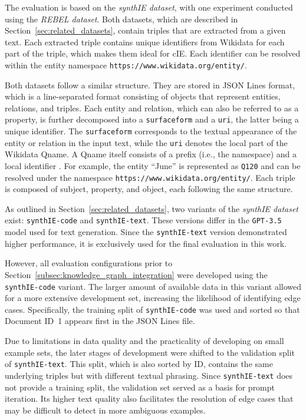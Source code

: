 \documentclass[a4paper,oneside,bibliography=totoc]{scrbook}
\begin{document}
The evaluation is based on the \textit{synthIE dataset}, with one experiment conducted using the \textit{REBEL dataset}. Both datasets, which are described in Section~\ref{sec:related_datasets}, contain triples that are extracted from a given text. Each extracted triple contains unique identifiers from Wikidata for each part of the triple, which makes them ideal for \ac{cIE}. Each identifier can be resolved within the entity namespace \texttt{https://www.wikidata.org/entity/}.

Both datasets follow a similar structure. They are stored in JSON Lines format, which is a line-separated format consisting of objects that represent entities, relations, and triples. Each entity and relation, which can also be referred to as a property, is further decomposed into a \texttt{surfaceform} and a \texttt{uri}, the latter being a unique identifier. The \texttt{surfaceform} corresponds to the textual appearance of the entity or relation in the input text, while the \texttt{uri} denotes the local part of the Wikidata Qname. A Qname itself consists of a prefix (i.e., the namespace) and a local identifier \cite{ASF2010}. For example, the entity \enquote{June} is represented as \texttt{Q120} and can be resolved under the namespace \texttt{https://www.wikidata.org/entity/}. Each triple is composed of subject, property, and object, each following the same structure.

As outlined in Section~\ref{sec:related_datasets}, two variants of the \textit{synthIE dataset} exist: \texttt{synthIE-code} and \texttt{synthIE-text}. These versions differ in the \texttt{GPT-3.5} model used for text generation. Since the \texttt{synthIE-text} version demonstrated higher performance, it is exclusively used for the final evaluation in this work.

However, all evaluation configurations prior to Section~\ref{subsec:knowledge_graph_integration} were developed using the \texttt{synthIE-code} variant. The larger amount of available data in this variant allowed for a more extensive development set, increasing the likelihood of identifying edge cases. Specifically, the training split of \texttt{synthIE-code} was used and sorted so that Document ID~1 appears first in the JSON Lines file.

Due to limitations in data quality and the practicality of developing on small example sets, the later stages of development were shifted to the validation split of \texttt{synthIE-text}. This split, which is also sorted by ID, contains the same underlying triples but with different textual phrasing. Since \texttt{synthIE-text} does not provide a training split, the validation set served as a basis for prompt iteration. Its higher text quality also facilitates the resolution of edge cases that may be difficult to detect in more ambiguous examples.
\end{document}
